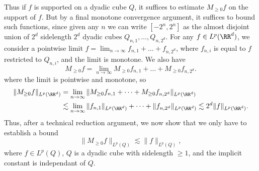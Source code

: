 %
Thus if $f$ is supported on a dyadic cube $Q$, it suffices to estimate $M_{\geq 0} f$ on the support of $f$. But by a final monotone convergence argument, it suffices to bound such functions, since given any $n$ we can write $[-2^n,2^n]$ as the almost disjoint union of $2^d$ sidelength $2^d$ dyadic cubes $Q_{n,1},\dots,Q_{n,2^d}$. For any $f \in L^p(\RR^d)$, we consider a pointwise limit $f = \lim_{n \to \infty} f_{n,1} + \dots + f_{n,2^d}$, where $f_{n,i}$ is equal to $f$ restricted to $Q_{n,i}$, and the limit is monotone. We also have
%
\[ M_{\geq 0} f = \lim_{n \to \infty} M_{\geq 0} f_{n,1} + \dots + M_{\geq 0} f_{n,2^d}. \]
%
where the limit is pointwise and monotone, so
%
\begin{align*}
  \| M_{\geq 0} f \|_{L^p(\RR^d)} &= \lim_{n \to \infty} \| M_{\geq 0} f_{n,1} + \dots + M_{\geq 0} f_{n,2^d} \|_{L^p(\RR^d)}\\
  &\lesssim \lim_{n \to \infty} \| f_{n,1} \|_{L^p(\RR^d)} + \dots + \| f_{n,2^d} \|_{L^p(\RR^d)} \lesssim 2^d \| f \|_{L^p(\RR^d)}.
\end{align*}
%
Thus, after a technical reduction argument, we now show that we only have to establish a bound
%
\[ \| M_{\geq 0} f \|_{L^p(Q)} \lesssim \| f \|_{L^p(Q)}, \]
%
where $f \in L^p(Q)$, $Q$ is a dyadic cube with sidelength $\geq 1$, and the implicit constant is independant of $Q$.


